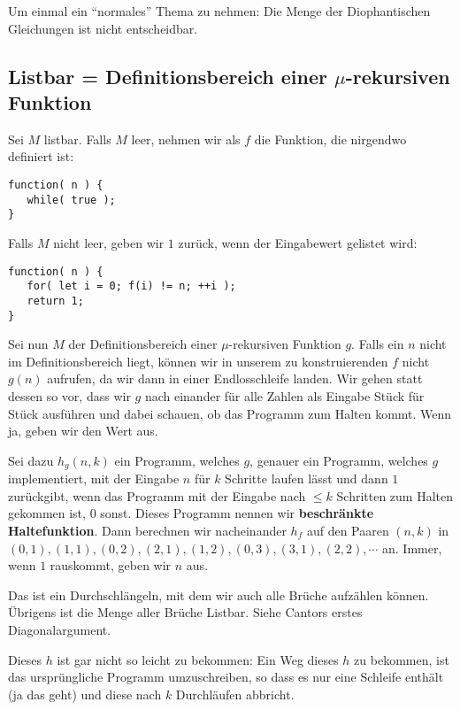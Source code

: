 \documentclass[a4paper]{amsart}
\theoremstyle{definition}
\begin{document}
Um einmal ein "`normales"' Thema zu nehmen: Die Menge der Diophantischen Gleichungen ist nicht entscheidbar.

\subsection{Listbar = Definitionsbereich einer $\mu$-rekursiven Funktion}
Sei $M$ listbar. Falls $M$ leer, nehmen wir als $f$ die Funktion, die nirgendwo definiert ist:
\begin{lstlisting}
function( n ) {
   while( true );
}
\end{lstlisting}
Falls $M$ nicht leer, geben wir $1$ zurück, wenn der Eingabewert gelistet wird:
\begin{lstlisting}
function( n ) {
   for( let i = 0; f(i) != n; ++i );
   return 1;
}
\end{lstlisting}

Sei nun $M$ der Definitionsbereich einer $\mu$-rekursiven Funktion $g$. Falls ein $n$ nicht im Definitionsbereich liegt, können wir in unserem zu konstruierenden $f$ nicht $g(n)$ aufrufen, da wir dann in einer Endlosschleife landen. Wir gehen statt dessen so vor, dass wir $g$ nach einander für alle Zahlen als Eingabe Stück für Stück ausführen und dabei schauen, ob das Programm zum Halten kommt. Wenn ja, geben wir den Wert aus.

Sei dazu $h_g(n,k)$ ein Programm, welches $g$, genauer ein Programm, welches $g$ implementiert, mit der Eingabe $n$ für $k$ Schritte laufen lässt und dann $1$ zurückgibt, wenn das Programm mit der Eingabe nach $ \le k$ Schritten zum Halten gekommen ist, $0$ sonst. Dieses Programm nennen wir \textbf{beschränkte Haltefunktion}. Dann berechnen wir nacheinander $h_f$ auf den Paaren $(n,k)$ in $(0,1), (1,1), (0,2), (2,1), (1,2),  (0,3), (3,1), (2,2) , \cdots$ an. Immer, wenn $1$ rauskommt, geben wir $n$ aus. 

Das ist ein Durchschlängeln, mit dem wir auch alle Brüche aufzählen können. Übrigens ist die Menge aller Brüche Listbar. Siehe Cantors erstes Diagonalargument.

Dieses $h$ ist gar nicht so leicht zu bekommen:
Ein Weg dieses $h$ zu bekommen, ist das ursprüngliche Programm umzuschreiben, so dass es nur eine Schleife enthält (ja das geht) und diese nach $k$ Durchläufen abbricht.
\end{document}
